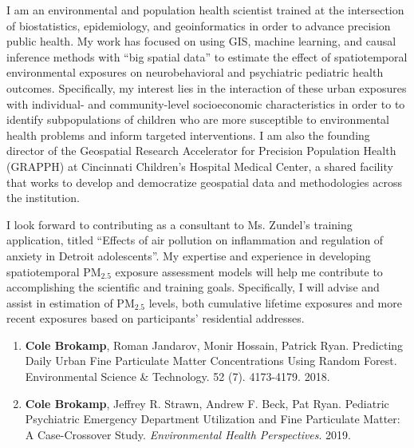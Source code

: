 \documentclass{nihbiosketch}
\begin{document}
\begin{statement}

I am an environmental and population health scientist trained at the
intersection of biostatistics, epidemiology, and geoinformatics in order to
advance precision public health. My work has focused on using
GIS, machine learning, and causal inference methods with ``big spatial data'' to
estimate the effect of spatiotemporal environmental exposures on neurobehavioral and
psychiatric pediatric health
outcomes. Specifically, my interest lies in the
interaction of these urban exposures with individual- and community-level
socioeconomic characteristics in order to to identify subpopulations of children
who are more susceptible to environmental health problems and inform targeted
interventions. I am also the founding director of the Geospatial Research Accelerator for Precision Population Health (GRAPPH) at Cincinnati Children's Hospital Medical Center, a shared facility that works to develop and democratize geospatial data and methodologies across the institution.

I look forward to contributing as a consultant to Ms. Zundel's training application, titled ``Effects of air pollution on inflammation and regulation of anxiety in Detroit adolescents''. My expertise and experience in developing spatiotemporal PM$_{2.5}$ exposure assessment models will help me contribute to accomplishing the scientific and training goals.  Specifically, I will advise and assist in estimation of PM$_{2.5}$ levels, both cumulative lifetime exposures and more recent exposures based on participants' residential addresses.

\begin{enumerate}

	\item \textbf{Cole Brokamp}, Roman Jandarov, Monir Hossain, Patrick Ryan. Predicting Daily Urban Fine Particulate Matter Concentrations Using Random Forest. Environmental Science \& Technology. 52 (7). 4173-4179. 2018.
    
  \item \textbf{Cole Brokamp}, Jeffrey R. Strawn, Andrew F. Beck, Pat Ryan. Pediatric Psychiatric Emergency Department Utilization and Fine Particulate Matter: A Case-Crossover Study. \textit{Environmental Health Perspectives}. 2019.

\end{enumerate}

\end{statement}
\end{document}

